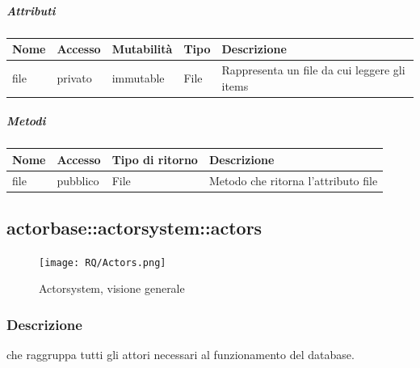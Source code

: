 \documentclass{scalatekids-article}
\begin{document}
\subparagraph{Attributi}
\begin{tabular}{| p{2cm} | p{1.5cm} | p{2cm} | p{3cm} | p{8.5cm} |}
  \hline
  Nome & Accesso & Mutabilità & Tipo & Descrizione\\
  \hline
  file & privato & immutable & File & Rappresenta un file da cui leggere gli items\\
  \hline
\end{tabular}

\subparagraph{Metodi}
\begin{tabular}{| l | l | l | l |}
  \hline
  Nome & Accesso & Tipo di ritorno & Descrizione\\
  \hline
  file & pubblico & File & Metodo che ritorna l'attributo file\\
  \hline
\end{tabular}


\subsection{actorbase::actorsystem::actors} %
\label{sec:actorbase::actorsystem::actors}

\begin{figure}[H]
  \begin{center}
    \texttt{[image: RQ/Actors.png]}
    \caption{Actorsystem, visione generale}
  \end{center}
\end{figure}

\subsubsection{Descrizione}

 che raggruppa tutti gli attori necessari al funzionamento del database.
\end{document}
